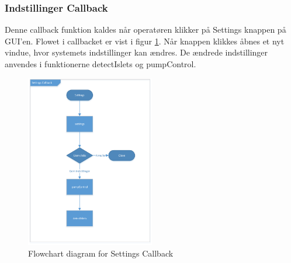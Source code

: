 \subsubsection{Indstillinger Callback}
Denne callback funktion kaldes når operatøren klikker på Settings knappen på GUI'en. Flowet i callbacket er vist i figur \ref{fig:act_settings}. Når knappen klikkes åbnes et nyt vindue, hvor systemets indstillinger kan ændres. De ændrede indstillinger anvendes i funktionerne detectIslets og pumpControl. 
\begin{figure}[H]
	\centering
	\includegraphics[width=0.5\textwidth]{billeder/act_settings-crop.pdf}
	\caption{Flowchart diagram for Settings Callback}
	\label{fig:act_settings}
\end{figure}
